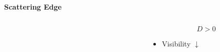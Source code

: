 \documentclass[
 ]{beamer}%
\begin{document}
\begin{frame}
    \textbf{Scattering Edge}

    \centering
    \scatteringedgeB
\end{frame}


\begin{frame}
    \begin{columns}
        \begin{column}{0.45\textwidth}
            \scatteringD

            \scatteringedgeC

            \scatteringillumination
        \end{column}
        \begin{column}{0.05\textwidth}
            
        \end{column}
        \begin{column}{0.4\textwidth}
            \vspace{-0.75cm}
            \begin{equation*}
                D>0
            \end{equation*}
            \begin{itemize}
                \vspace{-0.65cm}
                \centering
                \item Visibility $\downarrow$
            \end{itemize}


\end{column}
\end{columns}
\end{frame}
\end{document}
